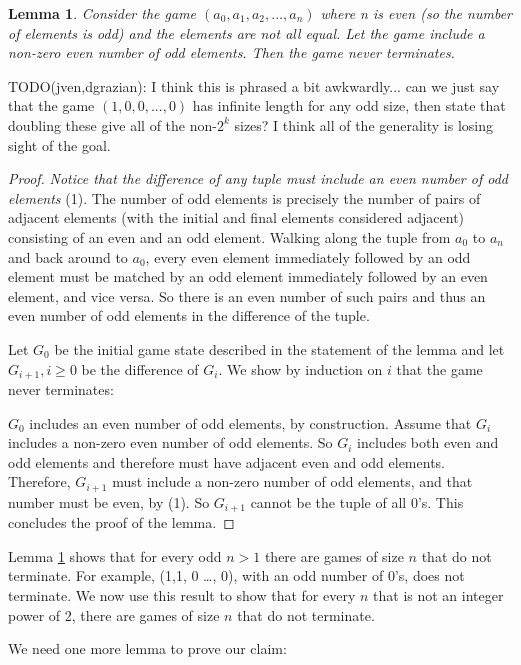 \documentclass[12pt]{amsart}
\newtheorem{lemma}[theorem]{Lemma}
\begin{document}
\begin{lemma}
Consider the game $(a_0, a_1, a_2, \ldots, a_n)$ where n is even (so the number of elements is odd) and the elements are not all equal. Let the game include a non-zero even number of odd elements. Then the game never terminates.
\label{lem:evenodds}
\end{lemma}

TODO(jven,dgrazian): I think this is phrased a bit awkwardly... can we just say that the game $(1,0,0,...,0)$ has infinite length for any odd size, then state that doubling these give all of the non-$2^k$ sizes? I think all of the generality is losing sight of the goal.

\begin{proof}
\emph{Notice that the difference of any tuple must include an even number of odd elements} (1). The number of odd elements is precisely the number of pairs of adjacent elements (with the initial and final elements considered adjacent) consisting of an even and an odd element. Walking along the tuple from $a_0$ to $a_n$ and back around to $a_0$, every even element immediately followed by an odd element must be matched by an odd element immediately followed by an even element, and vice versa. So there is an even number of such pairs and thus an even number of odd elements in the difference of the tuple.

Let $G_0$ be the initial game state described in the statement of the lemma and let $G_{i+1}, i \geq 0$ be the difference of $G_i$. We show by induction on $i$ that the game never terminates:

$G_0$ includes an even number of odd elements, by construction. Assume that $G_i$ includes a non-zero even number of odd elements. So $G_i$ includes both even and odd elements and therefore must have adjacent even and odd elements. Therefore, $G_{i+1}$ must include a non-zero number of odd elements, and that number must be even, by (1). So $G_{i+1}$ cannot be the tuple of all $0$'s. This concludes the proof of the lemma.
\end{proof}

Lemma \ref{lem:evenodds} shows that for every odd $n > 1$ there are games of size $n$ that do not terminate. For example, (1,1, 0 \ldots, 0), with an odd number of 0's, does not terminate. We now use this result to show that for every $n$ that is not an integer power of 2, there are games of size $n$ that do not terminate.

We need one more lemma to prove our claim:
\end{document}
